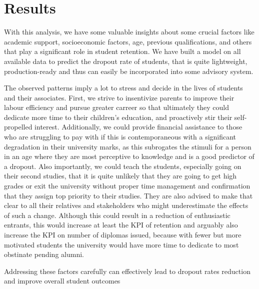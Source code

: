 \documentclass[
  letterpaper,
  DIV=11,
  numbers=noendperiod]{scrartcl}
\begin{document}
\hypertarget{results}{%
\section{\texorpdfstring{\textbf{Results}}{Results}}\label{results}}

With this analysis, we have some valuable insights about some crucial
factors like academic support, socioeconomic factors, age, previous
qualifications, and others that play a significant role in student
retention. We have built a model on all available data to predict the
dropout rate of students, that is quite lightweight, production-ready
and thus can easily be incorporated into some advisory system.

The observed patterns imply a lot to stress and decide in the lives of
students and their associates. First, we strive to insentivize parents
to improve their labour efficiency and pursue greater carreer so that
ultimately they could dedicate more time to their children's education,
and proactively stir their self-propelled interest. Additionally, we
could provide financial assistance to those who are struggling to pay
with if this is contemporaneous with a significant degradation in their
university marks, as this subrogates the stimuli for a person in an age
where they are most perceptive to knowledge and is a good predictor of a
dropout. Also importantly, we could teach the students, especially going
on their second studies, that it is quite unlikely that they are going
to get high grades or exit the university without proper time management
and confirmation that they assign top priority to their studies. They
are also advised to make that clear to all their relatives and
stakeholders who might underestimate the effects of such a change.
Although this could result in a reduction of enthusiastic entrants, this
would increase at least the KPI of retention and arguably also increase
the KPI on number of diplomas issued, because with fewer but more
motivated students the university would have more time to dedicate to
most obstinate pending alumni.

Addressing these factors carefully can effectively lead to dropout rates
reduction and improve overall student outcomes


\printbibliography
\end{document}
